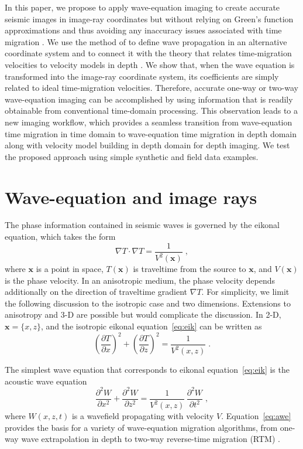 \documentclass[manuscript]{geophysics}
\begin{document}
In this paper, we propose to apply wave-equation imaging to create
accurate seismic images in image-ray coordinates but without relying
on Green's function approximations and thus avoiding any inaccuracy
issues associated with time migration \cite[]{fomel2013wave}. We use the method
of \cite{sava2005riemannian} to define wave propagation in an alternative
coordinate system and to connect it with the theory that relates
time-migration velocities to velocity models in depth \cite[]{ip}. We
show that, when the wave equation is transformed into the image-ray
coordinate system, its coefficients are simply related to ideal
time-migration velocities. Therefore, accurate one-way or two-way
wave-equation imaging can be accomplished by using information that is
readily obtainable from conventional time-domain processing. This
observation leads to a new imaging workflow, which provides a seamless
transition from wave-equation
time migration in time domain to wave-equation
time migration in depth domain along with velocity model building in depth domain for depth imaging. We test the proposed approach using simple synthetic and field data examples.

\section{Wave-equation and image rays}
The phase information contained in seismic waves is governed by the
eikonal equation, which takes the form \cite[]{chapman}
\begin{equation}
\label{eq:eik}
\nabla T \cdot \nabla T = \frac{1}{V^2(\mathbf{x})}\;,
\end{equation}
where $\mathbf{x}$ is a point in space, $T(\mathbf{x})$ is 
traveltime from the source to $\mathbf{x}$, and $V(\mathbf{x})$ is the
phase velocity. In an anisotropic medium, the phase velocity depends
additionally on the direction of traveltime gradient $\nabla
T$. For simplicity, we limit the following discussion to the isotropic
case and two dimensions. Extensions to anisotropy and 3-D are possible
but would complicate the discussion. In 2-D, $\mathbf{x}=\{x,z\}$, and 
the isotropic eikonal equation~\ref{eq:eik} can be written as
\begin{equation}
\label{eq:eik2}
\left(\frac{\partial T}{\partial x}\right)^2 + \left(\frac{\partial T}{\partial z}\right)^2 = \frac{1}{V^2(x,z)}\;.
\end{equation}

The simplest wave equation that corresponds to eikonal
equation~\ref{eq:eik} is the acoustic wave equation
\begin{equation}
\label{eq:awe}
\frac{\partial^2 W}{\partial x^2} + \frac{\partial^2 W}{\partial z^2} = \frac{1}{V^2(x,z)}\,\frac{\partial^2 W}{\partial t^2}\;,
\end{equation}
where $W(x,z,t)$ is a wavefield propagating with velocity
$V$. Equation~\ref{eq:awe} provides the basis for a variety of
wave-equation migration algorithms, from one-way wave extrapolation in
depth to two-way reverse-time migration (RTM) \cite[]{biondi,etgen}. 
\end{document}
